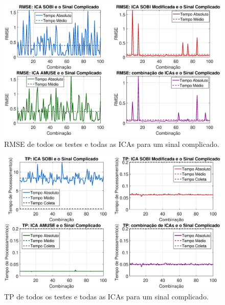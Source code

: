 \documentclass[a4paper,12pt]{monografia}
\theoremstyle{plain}
\theoremstyle{definition}
\theoremstyle{remark}
\begin{document}
\begin{figure}[!htb]
    \begin{center}
    \advance\leftskip -1.5cm
    \includegraphics[scale=0.45]{imagens/ImagensParaOAnexo/RMSEETodasICAsSinalComplicado.eps}
    \caption{RMSE de todos os testes e todas as ICAs para um sinal complicado.}
    \label{fig:RMSESinalComplicado}    
    \end{center}
\end{figure}

\begin{figure}[!htb]
    \begin{center}
    \advance\leftskip -1.5cm
    \includegraphics[scale=0.45]{imagens/ImagensParaOAnexo/TPAETodasICAsSinalComplicado.eps}
    \caption{TP de todos os testes e todas as ICAs para um sinal complicado.}
    \label{fig:TPSinalComplicado}    
    \end{center}
\end{figure}
\end{document}
